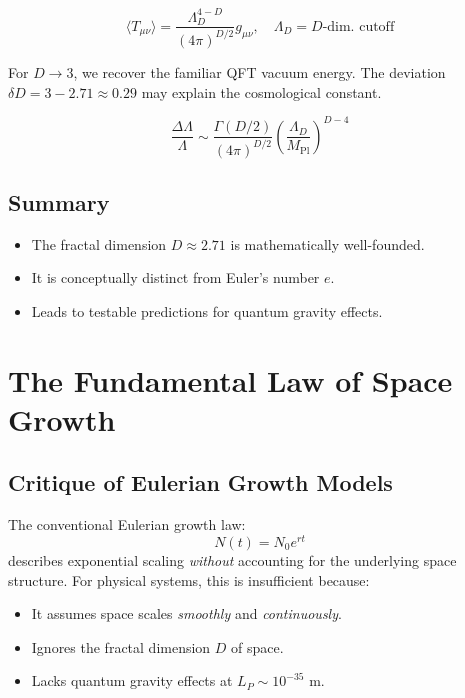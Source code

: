 \begin{equation}  
\langle T_{\mu\nu}\rangle = \frac{\Lambda_D^{4-D}}{(4\pi)^{D/2}} g_{\mu\nu}, \quad \Lambda_D = D\text{-dim. cutoff}  
\end{equation}  

\begin{remark}  
For $D\to 3$, we recover the familiar QFT vacuum energy. The deviation $\delta D = 3 - 2.71 \approx 0.29$ may explain the cosmological constant.  
\end{remark}  

\begin{equation}  
\frac{\Delta\Lambda}{\Lambda} \sim \frac{\Gamma(D/2)}{(4\pi)^{D/2}} \left(\frac{\Lambda_D}{M_{\mathrm{Pl}}}\right)^{D-4}  
\end{equation}  

\subsection*{Summary}  
\begin{itemize}  
\item The fractal dimension $D \approx 2.71$ is mathematically well-founded.  
\item It is conceptually distinct from Euler's number $e$.  
\item Leads to testable predictions for quantum gravity effects.  
\end{itemize}  

\section{The Fundamental Law of Space Growth}  
\label{sec:space_growth_law}  

\subsection{Critique of Eulerian Growth Models}  
\label{subsec:euler_critique}  

The conventional Eulerian growth law:  
\begin{equation}  
N(t) = N_0 e^{rt}  
\end{equation}  
describes exponential scaling \textit{without} accounting for the underlying space structure. For physical systems, this is insufficient because:  

\begin{itemize}  
\item It assumes space scales \textit{smoothly} and \textit{continuously}.  
\item Ignores the fractal dimension $D$ of space.  
\item Lacks quantum gravity effects at $L_P \sim 10^{-35}$ m.  
\end{itemize}  

